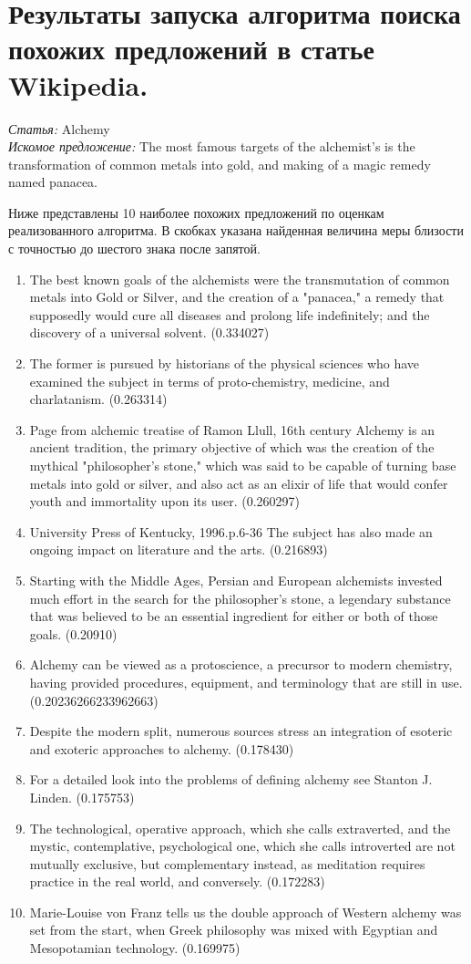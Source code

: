 \section{Результаты запуска алгоритма поиска похожих предложений в статье Wikipedia.}
\label{app:sentence_wikipedia_search}

\textit{Статья:} Alchemy\\
\textit{Искомое предложение:} The most famous targets of the alchemist's is the 
transformation of common metals into gold, and making of a magic remedy named panacea.

Ниже представлены 10 наиболее похожих предложений по оценкам реализованного алгоритма.
В скобках указана найденная величина меры близости с точностью до шестого знака после запятой.
\begin{enumerate}
\item{
The best known goals of the alchemists were the transmutation of common metals into Gold or Silver, and the creation of a "panacea," a remedy that supposedly would cure all diseases and prolong life indefinitely; and the discovery of a universal solvent. (0.334027)
}
\item{
The former is pursued by historians of the physical sciences who have examined the subject in terms of proto-chemistry, medicine, and charlatanism. (0.263314)
}
\item{
Page from alchemic treatise of Ramon Llull, 16th century Alchemy is an ancient tradition, the primary objective of which was the creation of the mythical "philosopher's stone," which was said to be capable of turning base metals into gold or silver, and also act as an elixir of life that would confer youth and immortality upon its user. (0.260297)
}
\item{
University Press of Kentucky, 1996.p.6-36  The subject has also made an ongoing impact on literature and the arts. (0.216893)
}
\item{
Starting with the Middle Ages, Persian and European alchemists invested much effort in the search for the philosopher's stone, a legendary substance that was believed to be an essential ingredient for either or both of those goals. (0.20910)
}
\item{
Alchemy can be viewed as a protoscience, a precursor to modern chemistry, having provided procedures, equipment, and terminology that are still in use. (0.20236266233962663)
}
\item{
Despite the modern split, numerous sources stress an integration of esoteric and exoteric approaches to alchemy. (0.178430)
}
\item{
For a detailed look into the problems of defining alchemy see Stanton J. Linden. (0.175753)
}
\item{
The technological, operative approach, which she calls extraverted, and the mystic, contemplative, psychological one, which she calls introverted are not mutually exclusive, but complementary instead, as meditation requires practice in the real world, and conversely. (0.172283)
}
\item{
Marie-Louise von Franz tells us the double approach of Western alchemy was set from the start, when Greek philosophy was mixed with Egyptian and Mesopotamian technology. (0.169975)
}
\end{enumerate}
